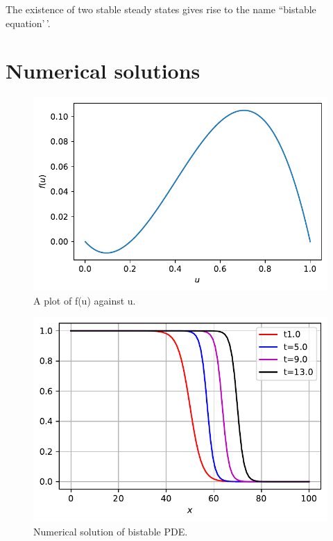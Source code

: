 \documentclass[
  letterpaper,
  DIV=11,
  numbers=noendperiod]{scrreprt}
\theoremstyle{definition}
\theoremstyle{plain}
\theoremstyle{plain}
\theoremstyle{remark}
\begin{document}
The existence of two stable steady states gives rise to the name
``bistable equation'\,'.

\hypertarget{numerical-solutions-2}{%
\section{Numerical solutions}\label{numerical-solutions-2}}

\begin{figure}

{\centering \includegraphics{nonlinearreactiondiffusion_files/figure-pdf/fig-bistablepde-output-1.pdf}

}

\caption{\label{fig-bistablepde}A plot of f(u) against u.}

\end{figure}

\begin{figure}

{\centering \includegraphics{nonlinearreactiondiffusion_files/figure-pdf/fig-bistablepde-output-2.pdf}

}

\caption{\label{fig-bistablepde}Numerical solution of bistable PDE.}

\end{figure}
\end{document}
